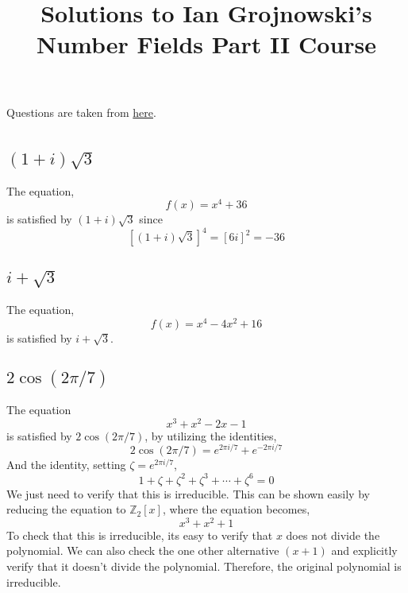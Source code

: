 \documentclass{article}
\begin{document}
\title{Solutions to Ian Grojnowski's Number Fields Part II Course}

\maketitle

Questions are taken from \href{https://dec41.user.srcf.net/notes/II_L/number_fields_eg.pdf}{here}.

\section{}

\subsection{\((1+i)\sqrt{3}\)}
The equation,
\begin{equation}
f(x) = x^{4} + 36
\end{equation}
is satisfied by \((1+i)\sqrt{3}\) since
\begin{equation}
\left[(1+i)\sqrt{3}\right]^{4} = \left[6i\right]^{2} = -36
\end{equation}

\subsection{\(i+\sqrt{3}\)}
The equation,
\begin{equation}
f(x) = x^{4} - 4x^{2} + 16
\end{equation}
is satisfied by \(i+\sqrt{3}\).

\subsection{\(2\cos(2\pi/7)\)}
The equation
\begin{equation}
x^{3} + x^{2} - 2x - 1
\end{equation}
is satisfied by \(2\cos(2\pi/7)\), by utilizing the identities,
\begin{equation}
2\cos(2\pi/7) = e^{2\pi i / 7} + e^{-2\pi i / 7}
\end{equation}
And the identity, setting \(\zeta = e^{2\pi i / 7}\),
\begin{equation}
1+\zeta + \zeta^{2} + \zeta^{3} + \cdots + \zeta^{6} = 0
\end{equation}
We just need to verify that this is irreducible. This can be shown easily by reducing the equation to \(\mathbb{Z}_{2}\left[x\right]\), where the equation becomes,
\begin{equation}
x^{3} + x^{2} + 1
\end{equation}
To check that this is irreducible, its easy to verify that \(x\) does not divide the polynomial. We can also check the one other alternative \((x+1)\) and explicitly verify that it doesn't divide the polynomial. Therefore, the original polynomial is irreducible.
\end{document}
